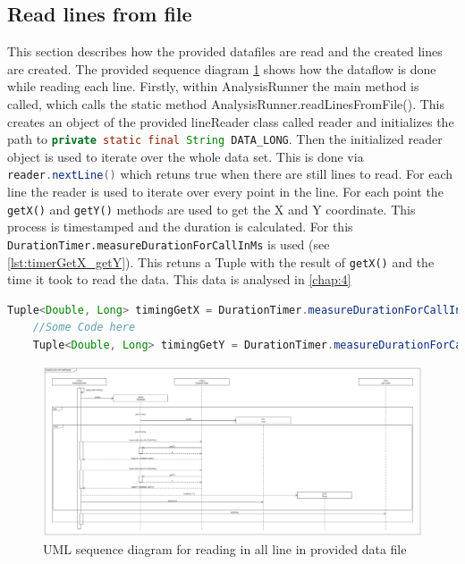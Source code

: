 \subsection{Read lines from file}
This section describes how the provided datafiles are read and the created lines are created. The provided sequence diagram \ref{fig:seq_read} shows how the dataflow is done while reading each line. Firstly, within AnalysisRunner the main method is called, which calls the static method AnalysisRunner.readLinesFromFile(). This creates an object of the provided lineReader class called reader and initializes the path to \lstinline[language=java]{private static final String DATA_LONG}. Then the initialized reader object is used to iterate over the whole data set. This is done via \lstinline[language=java]{reader.nextLine()} which retuns true when there are still lines to read. For each line the reader is used to iterate over every point in the line. For each point the \texttt{getX()} and \texttt{getY()} methods are used to get the X and Y coordinate. This process is timestamped and the duration is calculated. For this \texttt{DurationTimer.measureDurationForCallInMs} is used (see \ref{lst:timerGetX_getY}). This retuns a Tuple with the result of \texttt{getX()} and the time it took to read the data. This data is analysed in \ref{chap:4}

\begin{lstlisting}[language=java, caption=Measure duration for calls getX, label=lst:timerGetX_getY]
    Tuple<Double, Long> timingGetX = DurationTimer.measureDurationForCallInMs(() -> reader.getX());
    //Some Code here
    Tuple<Double, Long> timingGetY = DurationTimer.measureDurationForCallInMs(() -> reader.getY());
\end{lstlisting}

\begin{landscape}
    \begin{figure}
        \begin{center}
            \includegraphics[width=1.75\textwidth, height=0.99\textheight]{img/sequence_read.png}
            \caption{UML sequence diagram for reading in all line in provided data file}
            \label{fig:seq_read}
        \end{center}
    \end{figure}
\end{landscape}

